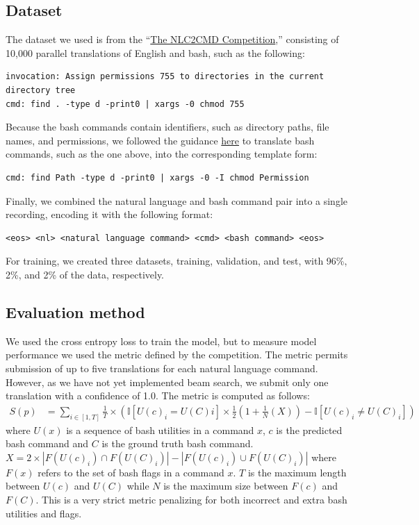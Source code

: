\subsection{Dataset}
The dataset we used is from the ``\href{https://nlc2cmd.us-east.mybluemix.net/}{The NLC2CMD Competition},'' consisting of 10,000 parallel translations of English and bash, such as the following:
\begin{verbatim}
invocation: Assign permissions 755 to directories in the current directory tree
cmd: find . -type d -print0 | xargs -0 chmod 755
\end{verbatim}
Because the bash commands contain identifiers, such as directory paths, file names, and permissions, we followed the guidance \href{https://github.com/IBM/clai/tree/nlc2cmd}{here} to translate bash commands, such as the one above, into the corresponding template form:
\begin{verbatim}
cmd: find Path -type d -print0 | xargs -0 -I chmod Permission
\end{verbatim}
Finally, we combined the natural language and bash command pair into a single recording, encoding it with the following format:
\begin{verbatim}
<eos> <nl> <natural language command> <cmd> <bash command> <eos> 
\end{verbatim}
For training, we created three datasets, training, validation, and test, with
96\%, 2\%, and 2\% of the data, respectively.

\subsection{Evaluation method}
We used the cross entropy loss to train the model, but to measure model
performance we used the metric defined by the competition. The metric permits
submission of up to five translations for each natural language command.
However, as we have not yet implemented beam search, we submit only one
translation with a confidence of 1.0. The metric is computed as follows:
\begin{align*}
	S(p) & =\sum_{i\in[1,T]}\frac{1}{T}\times\left(
	\mathbb{I}[U(c)_i=U(C)i]\times\frac{1}{2}\left(
		1+\frac{1}{N}\left(X\right)\right) -\mathbb{I}[U(c)_i\ne U(C)_i]
	\right)
\end{align*}
where $U(x)$ is a sequence of bash utilities in a command $x$, $c$ is the
predicted bash command and $C$ is the ground truth bash command. $X = 2\times
	|F(U(c)_i)\cap F(U(C)_i)| - |F(U(c)_i)\cup F(U(C)_i)|$ where $F(x)$ refers to
the set of bash flags in a command $x$. $T$ is the maximum length between
$U(c)$ and $U(C)$ while $N$ is the maximum size between $F(c)$ and $F(C)$. This
is a very strict metric penalizing for both incorrect and extra bash
utilities and flags.

